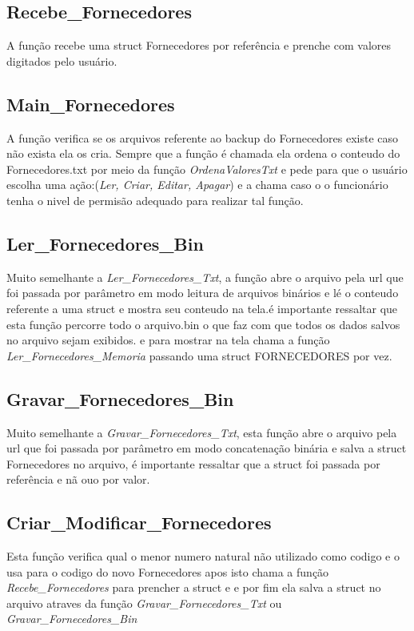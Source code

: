 \documentclass{article}
\begin{document}
\subsection{Recebe\_Fornecedores}
	A função recebe uma struct  Fornecedores por referência e prenche com valores digitados pelo usuário.

\subsection{Main\_Fornecedores}
	A função verifica se os arquivos referente ao backup do Fornecedores existe caso não exista ela os cria. Sempre que a função é chamada ela ordena o conteudo do Fornecedores.txt por meio da função \textit{OrdenaValoresTxt} e pede para que o usuário escolha uma ação:(\textit{Ler, Criar, Editar, Apagar})  e a chama caso o  o funcionário tenha o nivel de permisão adequado para realizar tal função.

\subsection{Ler\_Fornecedores\_Bin}
	Muito semelhante a \textit{Ler\_Fornecedores\_Txt}, a função abre o arquivo pela url que foi passada por parâmetro em modo leitura de arquivos binários e lé o conteudo referente a uma struct e mostra seu conteudo na tela.é importante ressaltar que esta função percorre todo o arquivo.bin o que faz com que todos os dados salvos no arquivo sejam exibidos. e para mostrar na tela chama a função \textit{Ler\_Fornecedores\_Memoria} passando uma struct FORNECEDORES  por vez.

\subsection{Gravar\_Fornecedores\_Bin}
	Muito semelhante a \textit{Gravar\_Fornecedores\_Txt}, esta função abre o arquivo pela url que foi passada por parâmetro em modo concatenação binária e salva a struct Fornecedores  no arquivo, é importante ressaltar que  a struct foi passada por referência e nã ouo por valor.

\subsection{Criar\_Modificar\_Fornecedores}
	Esta função verifica qual o menor numero natural não utilizado como codigo e o usa para o codigo do novo Fornecedores apos isto  chama a função \textit{Recebe\_Fornecedores} para prencher a struct e e por fim ela salva a struct no arquivo atraves da função \textit{Gravar\_Fornecedores\_Txt} ou \textit{Gravar\_Fornecedores\_Bin}
\end{document}
